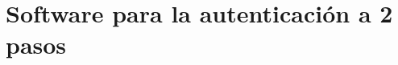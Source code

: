 \section{Software para la autenticación a 2 pasos}

\begin{frame}[c]{}
  \vspace{\baselineskip}
\end{frame}

\begin{frame}[fragile]
  \frametitle{}
  \vspace{\baselineskip}
  \begin{lstlisting}[language=Bash,numbers=none]
  \end{lstlisting}
\end{frame}
